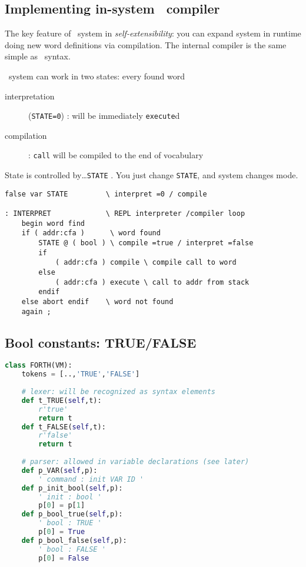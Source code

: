 \subsection{Implementing in-system \F\ compiler}

The key feature of \F\ system in \emph{self-extensibility}: you can expand
system in runtime doing new word definitions via compilation. The internal
compiler is the same simple as \F\ syntax.

\bigskip
\F\ system can work in two states: every found word 
\begin{description}
  \item[interpretation] (\verb|STATE=0|) : 
  will be immediately \verb|execute|d
  \item[compilation]: \verb|call| will be compiled to the end of vocabulary 
\end{description}
State is controlled by\ldots \verb|STATE| . You just change
\verb|STATE|, and system changes mode.

\clearpage
\begin{lstlisting}[language=Forth]
false var STATE			\ interpret =0 / compile 

: INTERPRET				\ REPL interpreter /compiler loop
	begin word find
	if ( addr:cfa )		 \ word found
		STATE @ ( bool ) \ compile =true / interpret =false  
		if
			( addr:cfa ) compile \ compile call to word
		else
			( addr:cfa ) execute \ call to addr from stack
		endif
	else abort endif	\ word not found 
	again ;
\end{lstlisting}

\clearpage
\subsection{Bool constants: TRUE/FALSE}

\begin{lstlisting}[language=Python]
class FORTH(VM):
	tokens = [..,'TRUE','FALSE']
	
	# lexer: will be recognized as syntax elements
 	def t_TRUE(self,t):
 		r'true'
 		return t
 	def t_FALSE(self,t):
 		r'false'
 		return t
 		
 	# parser: allowed in variable declarations (see later)
 	def p_VAR(self,p):
 		' command : init VAR ID '
 	def p_init_bool(self,p):
 		' init : bool '
 		p[0] = p[1]
 	def p_bool_true(self,p):
 		' bool : TRUE '
 		p[0] = True
 	def p_bool_false(self,p):
 		' bool : FALSE '
 		p[0] = False
\end{lstlisting}


